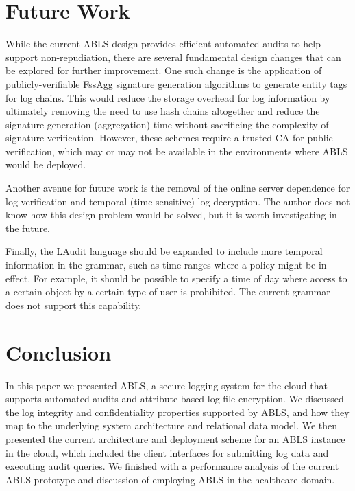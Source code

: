 \documentclass{sig-alternate}
\begin{document}
\section{Future Work}
While the current ABLS design provides efficient automated audits to help support non-repudiation, 
there are several fundamental design changes that can be explored for further improvement. One such change 
is the application of publicly-verifiable FssAgg signature generation algorithms to generate entity tags for log chains. 
This would reduce the storage overhead for log information by ultimately removing the need to use hash chains
altogether and reduce the signature generation (aggregation) time without sacrificing the complexity of signature
verification. However, these schemes require a trusted CA for public verification, which may or may not be available
in the environments where ABLS would be deployed. 

Another avenue for future work is the removal of the online server dependence for log verification and temporal
(time-sensitive) log decryption. The author does not know how this design problem would be solved, but it is worth
investigating in the future. 

Finally, the LAudit language should be expanded to include more temporal information in the grammar, such as 
time ranges where a policy might be in effect. For example, it should be possible to specify a time of day where access
to a certain object by a certain type of user is prohibited. The current grammar does not support this capability. 

\section{Conclusion}
In this paper we presented ABLS, a secure logging system for the cloud that supports automated audits and
attribute-based log file encryption. We discussed the log integrity and confidentiality properties supported by ABLS, 
and how they map to the underlying system architecture and relational data model. We then presented the current
architecture and deployment scheme for an ABLS instance in the cloud, which included the client interfaces for 
submitting log data and executing audit queries. We finished with a performance analysis of the current ABLS prototype 
and discussion of employing ABLS in the healthcare domain. 
\end{document}
